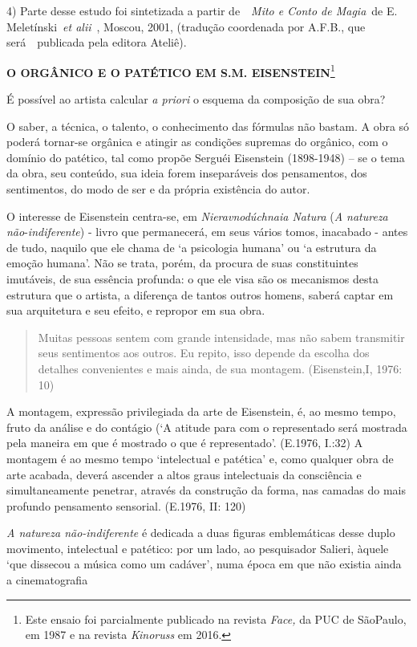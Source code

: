 4) Parte desse estudo foi sintetizada a partir de~~\emph{Mito e Conto de
Magia}~de E. Meletínski~\emph{et alii}~, Moscou, 2001, (tradução
coordenada por A.F.B., que será~~publicada pela editora Ateliê).

\textbf{O ORGÂNICO E O PATÉTICO EM S.M. EISENSTEIN}\footnote{Este ensaio
  foi parcialmente publicado na revista \emph{Face,} da PUC de SãoPaulo,
  em 1987 e na revista \emph{Kinoruss} em 2016.}

É possível ao artista calcular \emph{a priori} o esquema da composição
de sua obra?

O saber, a técnica, o talento, o conhecimento das fórmulas não bastam. A
obra só poderá tornar-se orgânica e atingir as condições supremas do
orgânico, com o domínio do patético, tal como propõe Serguéi Eisenstein
(1898-1948) -- se o tema da obra, seu conteúdo, sua ideia forem
inseparáveis dos pensamentos, dos sentimentos, do modo de ser e da
própria existência do autor.

O interesse de Eisenstein centra-se, em \emph{Nieravnodúchnaia Natura}
(\emph{A natureza não}-\emph{indiferente}) - livro que permanecerá, em
seus vários tomos, inacabado - antes de tudo, naquilo que ele chama de
`a psicologia humana' ou `a estrutura da emoção humana'. Não se trata,
porém, da procura de suas constituintes imutáveis, de sua essência
profunda: o que ele visa são os mecanismos desta estrutura que o
artista, a diferença de tantos outros homens, saberá captar em sua
arquitetura e seu efeito, e repropor em sua obra.

\begin{quote}
Muitas pessoas sentem com grande intensidade, mas não sabem transmitir
seus sentimentos aos outros. Eu repito, isso depende da escolha dos
detalhes convenientes e mais ainda, de sua montagem. (Eisenstein,I,
1976: 10)
\end{quote}

A montagem, expressão privilegiada da arte de Eisenstein, é, ao mesmo
tempo, fruto da análise e do contágio (`A atitude para com o
representado será mostrada pela maneira em que é mostrado o que é
representado'. (E.1976, I.:32) A montagem é ao mesmo tempo `intelectual
e patética' e, como qualquer obra de arte acabada, deverá ascender a
altos graus intelectuais da consciência e simultaneamente penetrar,
através da construção da forma, nas camadas do mais profundo pensamento
sensorial. (E.1976, II: 120)

\emph{A natureza não-indiferente} é dedicada a duas figuras emblemáticas
desse duplo movimento, intelectual e patético: por um lado, ao
pesquisador Salieri, àquele `que dissecou a música como um cadáver',
numa época em que não existia ainda a cinematografia


